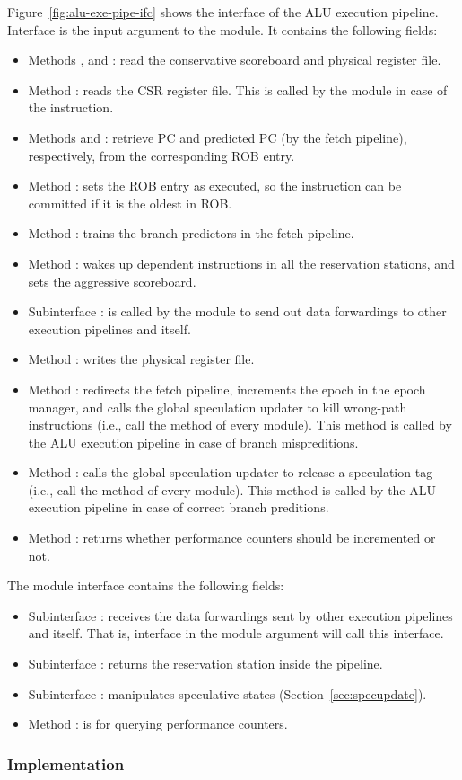 Figure~\ref{fig:alu-exe-pipe-ifc} shows the interface of the ALU execution pipeline.
Interface  is the input argument to the module.
It contains the following fields:
\begin{itemize}
    \item Methods ,  and : read the conservative scoreboard and physical register file.
    \item Method : reads the CSR register file.
    This is called by the module in case of the  instruction.
    \item Methods  and : retrieve PC and predicted PC (by the fetch pipeline), respectively, from the corresponding ROB entry.
    \item Method : sets the ROB entry as executed, so the instruction can be committed if it is the oldest in ROB.
    \item Method : trains the branch predictors in the fetch pipeline.
    \item Method : wakes up dependent instructions in all the reservation stations, and sets the aggressive scoreboard.
    \item Subinterface : is called by the module to send out data forwardings to other execution pipelines and itself.
    \item Method : writes the physical register file.
    \item Method : redirects the fetch pipeline, increments the epoch in the epoch manager, and calls the global speculation updater to kill wrong-path instructions (i.e., call the  method of every module).
    This method is called by the ALU execution pipeline in case of branch mispreditions.
    \item Method : calls the global speculation updater to release a speculation tag (i.e., call the  method of every module).
    This method is called by the ALU execution pipeline in case of correct branch preditions.
    \item Method : returns whether performance counters should be incremented or not.
\end{itemize}
The module interface  contains the following fields:
\begin{itemize}
    \item Subinterface : receives the data forwardings sent by other execution pipelines and itself.
    That is, interface  in the module argument will call this interface.
    \item Subinterface : returns the reservation station inside the pipeline.
    \item Subinterface : manipulates speculative states (Section~\ref{sec:specupdate}).
    \item Method : is for querying performance counters.
\end{itemize}

\subsubsection{Implementation}